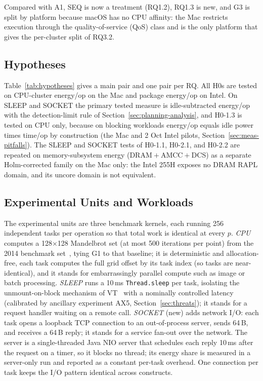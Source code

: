 Compared with A1, SEQ is now a treatment (RQ1.2), RQ1.3 is new, and G3 is split by platform because macOS has no CPU affinity: the Mac restricts execution through the quality-of-service (QoS) class and is the only platform that gives the per-cluster split of RQ3.2.

\subsection{Hypotheses}\label{sec:planning-hypotheses}
Table~\ref{tab:hypotheses} gives a main pair and one pair per RQ. All H0s are tested on CPU-cluster energy/op on the Mac and package energy/op on Intel. On SLEEP and SOCKET the primary tested measure is idle-subtracted energy/op with the detection-limit rule of Section~\ref{sec:planning-analysis}, and H0-1.3 is tested on CPU only, because on blocking workloads energy/op equals idle power times time/op by construction (the Mac and 2 Oct Intel pilots, Section~\ref{sec:meas-pitfalls}). The SLEEP and SOCKET tests of H0-1.1, H0-2.1, and H0-2.2 are repeated on memory-subsystem energy (DRAM${}+{}$AMCC${}+{}$DCS) as a separate Holm-corrected family on the Mac only: the Intel 255H exposes no DRAM RAPL domain, and its uncore domain is not equivalent.

\subsection{Experimental Units and Workloads}\label{sec:planning-units}
The experimental units are three benchmark kernels, each running 256 independent tasks per operation so that total work is identical at every $p$. \emph{CPU} computes a 128$\times$128 Mandelbrot set (at most 500 iterations per point) from the 2014 benchmark set~\cite{pinto2014energy}, tying G1 to that baseline; it is deterministic and allocation-free, each task computes the full grid offset by its task index (so tasks are near-identical), and it stands for embarrassingly parallel compute such as image or batch processing. \emph{SLEEP} runs a 10\,ms \texttt{Thread.sleep} per task, isolating the unmount-on-block mechanism of VT~\cite{jep444} with a nominally controlled latency (calibrated by ancillary experiment AX5, Section~\ref{sec:threats}); it stands for a request handler waiting on a remote call. \emph{SOCKET} (new) adds network I/O: each task opens a loopback TCP connection to an out-of-process server, sends 64\,B, and receives a 64\,B reply; it stands for a service fan-out over the network. The server is a single-threaded Java NIO server that schedules each reply 10\,ms after the request on a timer, so it blocks no thread; its energy share is measured in a server-only run and reported as a constant per-task overhead. One connection per task keeps the I/O pattern identical across constructs. 

